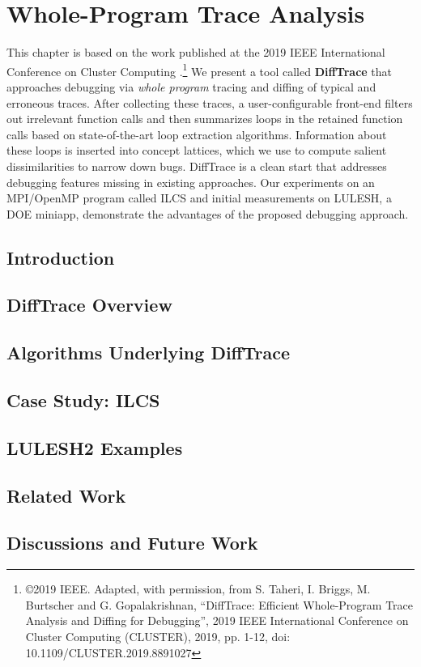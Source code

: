 
\chapter{Whole-Program Trace Analysis}
\label{sec:ch3}

This chapter is based on the work published at the 2019 IEEE International Conference on Cluster Computing \cite{diffTrace}.\footnote{\copyright 2019 IEEE. Adapted, with permission, from S. Taheri, I. Briggs, M. Burtscher and G. Gopalakrishnan, ``DiffTrace: Efficient Whole-Program Trace Analysis and Diffing for Debugging'', 2019 IEEE International Conference on Cluster Computing (CLUSTER), 2019, pp. 1-12, doi: 10.1109/CLUSTER.2019.8891027}
%
We present a tool called \textbf{DiffTrace} that approaches debugging via {\em whole program} tracing and
diffing of typical and erroneous traces.
%
After collecting these traces, a user-configurable front-end filters out irrelevant function calls and then summarizes loops in the retained function calls based on state-of-the-art loop extraction algorithms.
%
Information about these loops is inserted into concept lattices, which we use to compute salient dissimilarities to narrow down bugs.
%
DiffTrace is a clean start that addresses debugging features missing in existing approaches.
%
Our experiments on an MPI/OpenMP program called ILCS and initial measurements on LULESH, a DOE miniapp, demonstrate the advantages of the proposed debugging approach.

\section{Introduction}
\label{sec:ch3_intro}



\section{DiffTrace Overview}
\label{sec:ch3_overview}


\section{Algorithms Underlying DiffTrace}
\label{sec:ch3_algo}


\section{Case Study: ILCS}
\label{sec:ch3_ilcs-case-study}

%

\section{LULESH2 Examples}
\label{sec:ch3_lulesh}


\section{Related Work}
\label{sec:ch3_related}


\section{Discussions and Future Work}
\label{sec:ch3_discussion}

